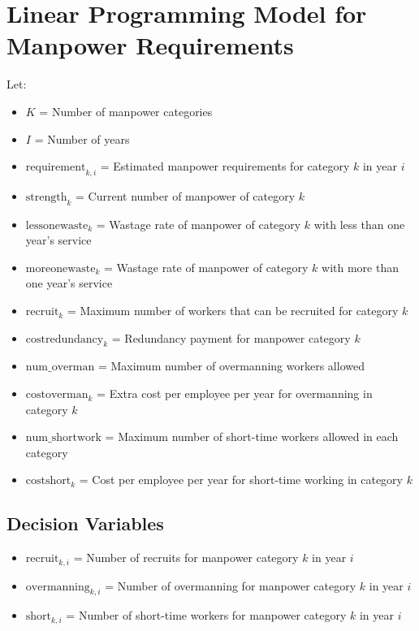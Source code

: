 \documentclass{article}
\begin{document}
\section*{Linear Programming Model for Manpower Requirements}

Let:
\begin{itemize}
    \item \( K \) = Number of manpower categories
    \item \( I \) = Number of years
    \item \( \text{requirement}_{k,i} \) = Estimated manpower requirements for category \( k \) in year \( i \)
    \item \( \text{strength}_{k} \) = Current number of manpower of category \( k \)
    \item \( \text{lessonewaste}_{k} \) = Wastage rate of manpower of category \( k \) with less than one year's service
    \item \( \text{moreonewaste}_{k} \) = Wastage rate of manpower of category \( k \) with more than one year's service
    \item \( \text{recruit}_{k} \) = Maximum number of workers that can be recruited for category \( k \)
    \item \( \text{costredundancy}_{k} \) = Redundancy payment for manpower category \( k \)
    \item \( \text{num\_overman} \) = Maximum number of overmanning workers allowed
    \item \( \text{costoverman}_{k} \) = Extra cost per employee per year for overmanning in category \( k \)
    \item \( \text{num\_shortwork} \) = Maximum number of short-time workers allowed in each category
    \item \( \text{costshort}_{k} \) = Cost per employee per year for short-time working in category \( k \)
\end{itemize}

\subsection*{Decision Variables}
\begin{itemize}
    \item \( \text{recruit}_{k,i} \) = Number of recruits for manpower category \( k \) in year \( i \)
    \item \( \text{overmanning}_{k,i} \) = Number of overmanning for manpower category \( k \) in year \( i \)
    \item \( \text{short}_{k,i} \) = Number of short-time workers for manpower category \( k \) in year \( i \)
\end{itemize}
\end{document}
